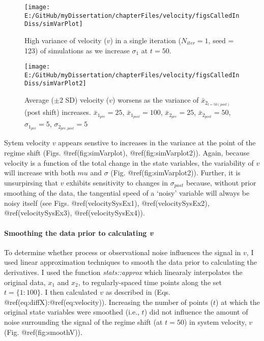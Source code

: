 \documentclass[]{article}
\let\oldparagraph\paragraph
\renewcommand{\paragraph}[1]{\oldparagraph{#1}\mbox{}}
\begin{document}
\begin{figure}

{\centering \texttt{[image: E:/GitHub/myDissertation/chapterFiles/velocity/figsCalledInDiss/simVarPlot]} 

}

\caption{High variance of velocity ($v$) in a single iteration ($N_{iter}=1$, seed = 123) of simulations as we increase $\sigma_1$ at $t=50$.}\label{fig:simVarPlot}
\end{figure}
\begin{figure}

{\centering \texttt{[image: E:/GitHub/myDissertation/chapterFiles/velocity/figsCalledInDiss/simVarPlot2]} 

}

\caption{Average ($\pm 2$ SD) velocity ($v$) worsens as the variance of $\bar{x}_{2_{t=50 (post)}}$ (post shift) increases. $\bar{x}_{1_{pre}} = 25$, $\bar{x}_{1_{post}} = 100$, $\bar{x}_{2_{pre}} = 25$, $\bar{x}_{2_{post}} = 50$, $\sigma_{1_{pre}} = 5$, $\sigma_{2_{pre,post}} = 5$}\label{fig:simVarPlot2}
\end{figure}

Sytem velocity \(v\) appears senstive to increases in the variance at
the point of the regime shift (Figs. @ref(fig:simVarplot),
@ref(fig:simVarplot2)). Again, because velocity is a function of the
total change in the state variables, the variability of \(v\) will
increase with both \(mu\) and \(\sigma\) (Fig. @ref(fig:simVarplot2)).
Further, it is unsurpirsing that \(v\) exhibits sensitivity to changes
in \(\sigma_{post}\) because, without prior smoothing of the data, the
tangential speed of a `noisy' variable will always be noisy itself (see
Figs. @ref(velocitySysEx1), @ref(velocitySysEx2), @ref(velocitySysEx3),
@ref(velocitySysEx4)).

\hypertarget{smoothing-the-data-prior-to-calculating-v}{%
\paragraph{\texorpdfstring{Smoothing the data prior to calculating
\emph{v}}{Smoothing the data prior to calculating v}}\label{smoothing-the-data-prior-to-calculating-v}}

To determine whether process or observational noise influences the
signal in \(v\), I used linear approximation techniques to smooth the
data prior to calculating the derivatives. I used the function
\emph{stats::approx} which linearaly interpolates the original data,
\(x_1\) and \(x_2\), to regularly-spaced time points along the set
\(t=\{1:100\}\). I then calculated \(v\) as described in (Eqs.
@ref(eq:diffX):@ref(eq:velocity)). Increasing the number of points
(\(t\)) at which the original state variables were smoothed (i.e.,
\(t\)) did not influence the amount of noise surrounding the signal of
the regime shift (at \(t=50\)) in system velocity, \(v\) (Fig.
@ref(fig:smoothV)).
\end{document}

